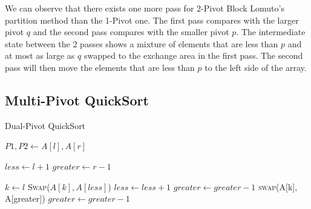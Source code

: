 \documentclass[a4paper,oneside,12pt]{book}
\begin{document}
We can observe that there exists one more pass for 2-Pivot Block Lomuto's partition method than the 1-Pivot one. The first pass compares with the larger pivot $q$ and the second pass compares with the smaller pivot $p$.
The intermediate state between the 2 passes shows a mixture of elements that are less than $p$ and at most as large as $q$ swapped to the exchange area in the first pass. The second pass will then move the elements that are less than $p$ to the left side of the array.



\subsection{Multi-Pivot QuickSort}

\begin{algorithm}[H]
    \caption{Dual-Pivot QuickSort}\label{DualPivotQuickSort}
    \begin{algorithmic}[1]

        \State $P1, P2 \gets A[l], A[r]$ 

        \State $less \gets l + 1$
        \State $greater \gets r - 1$

        \State $k \gets l$
             
                \State \textsc{Swap}($A[k], A[less]$) 
                \State $less \gets less + 1$
             
                    \State $greater \gets greater - 1$ 
                \EndWhile
                \State \textsc{swap}(A[k], A[greater]) 
                \State $greater \gets greater - 1$
    

\end{algorithmic}
\end{algorithm}
\end{document}
